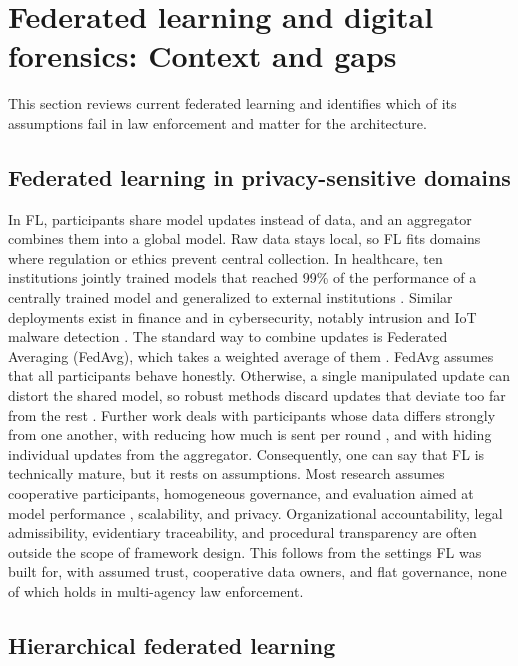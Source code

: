 \section{Federated learning and digital forensics: Context and gaps}
\label{Federated Learning and Digital Forensics: Context and Gaps}

This section reviews current federated learning and identifies which of its assumptions fail in law enforcement and matter for the architecture.


\subsection{Federated learning in privacy-sensitive domains}

In FL, participants share model updates instead of data, and an aggregator combines them into a global model. Raw data stays local, so FL fits domains where regulation or ethics prevent central collection. 
In healthcare, ten institutions jointly trained models that reached 99\% of the performance of a centrally trained model and generalized to external institutions \citep{sheller2020federated}. Similar deployments exist in finance \citep{FL_bank} and in cybersecurity, notably intrusion and IoT malware detection \citep{hernandez2025intrusion,jsan14040078}.
%
The standard way to combine updates is Federated Averaging (FedAvg), which takes a weighted average of them \citep{mcmahan2017communication}. FedAvg assumes that all participants behave honestly. Otherwise, a single manipulated update can distort the shared model, so robust methods discard updates that deviate too far from the rest \citep{NIPS2017_Krum,FedTrimmedAvg}.
Further work deals with participants whose data differs strongly from one another, with reducing how much is sent per round \citep{konevcny2016federated}, and with hiding individual updates from the aggregator.
%
Consequently, one can say that FL is technically mature, but it rests on assumptions. Most research assumes cooperative participants, homogeneous governance, and evaluation aimed at model performance \citep{riedel2024comparative}, scalability, and privacy. Organizational accountability, legal admissibility, evidentiary traceability, and procedural transparency are often outside the scope of framework design. This follows from the settings FL was built for, with assumed trust, cooperative data owners, and flat governance, none of which holds in multi-agency law enforcement.



\subsection{Hierarchical federated learning}
\label{subsec:Hierarchical Federated Learning}

